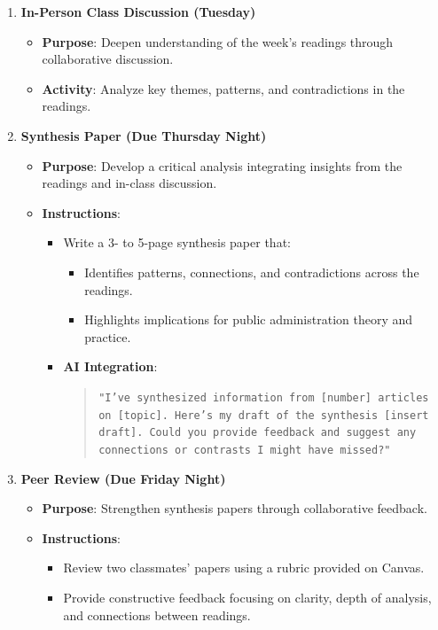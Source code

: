\documentclass[12pt, letterpaper]{article}
\begin{document}
\begin{enumerate}
\begin{itemize}
\begin{itemize}
\begin{quote}
            \end{quote}
        \end{itemize}
    \end{itemize}

    \item \textbf{In-Person Class Discussion (Tuesday)}
    \begin{itemize}
        \item \textbf{Purpose}: Deepen understanding of the week’s readings through collaborative discussion.
        \item \textbf{Activity}: Analyze key themes, patterns, and contradictions in the readings.
    \end{itemize}

    \item \textbf{Synthesis Paper (Due Thursday Night)}
    \begin{itemize}
        \item \textbf{Purpose}: Develop a critical analysis integrating insights from the readings and in-class discussion.
        \item \textbf{Instructions}:
        \begin{itemize}
            \item Write a 3- to 5-page synthesis paper that:
            \begin{itemize}
                \item Identifies patterns, connections, and contradictions across the readings.
                \item Highlights implications for public administration theory and practice.
            \end{itemize}
            \item \textbf{AI Integration}:
            \begin{quote}
                \texttt{"I've synthesized information from [number] articles on [topic]. Here's my draft of the synthesis [insert draft]. Could you provide feedback and suggest any connections or contrasts I might have missed?"}

            \end{quote}
        \end{itemize}
    \end{itemize}

    \item \textbf{Peer Review (Due Friday Night)}
    \begin{itemize}
        \item \textbf{Purpose}: Strengthen synthesis papers through collaborative feedback.
        \item \textbf{Instructions}:
        \begin{itemize}
            \item Review two classmates’ papers using a rubric provided on Canvas.
            \item Provide constructive feedback focusing on clarity, depth of analysis, and connections between readings.
        \end{itemize}
    \end{itemize}


\end{enumerate}
\end{document}
